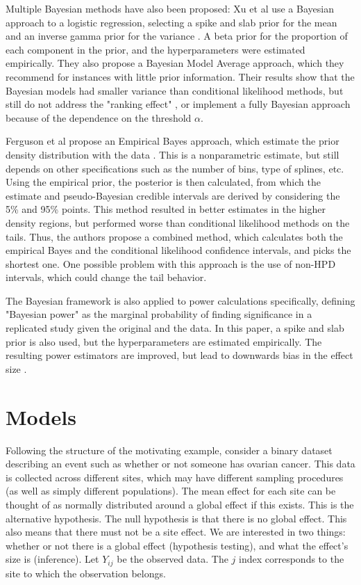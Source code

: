 \documentclass[AMA,STIX1COL]{WileyNJD-v2}\usepackage[]{graphicx}\usepackage[]{color}
\begin{document}
Multiple Bayesian methods have also been proposed: Xu et al use a Bayesian approach to a logistic regression, selecting a spike and slab prior for the mean and an inverse gamma prior for the variance \cite{xu2011bayesian}. A beta prior for the proportion of each component in the prior, and the hyperparameters were estimated empirically. They also propose a Bayesian Model Average approach, which they recommend for instances with little prior information. Their results show that the Bayesian models had smaller variance than conditional likelihood methods, but still do not address the "ranking effect" \cite{sun2011br}, or implement a fully Bayesian approach because of the dependence on the threshold $\alpha$.

Ferguson et al propose an Empirical Bayes approach, which estimate the prior density distribution with the data \cite{ferguson2013empirical}. This is a nonparametric estimate, but still depends on other specifications such as the number of bins, type of splines, etc. Using the empirical prior, the posterior is then calculated, from which the estimate and pseudo-Bayesian credible intervals are derived by considering the 5\% and 95\% points. This method resulted in better estimates in the higher density regions, but performed worse than conditional likelihood methods on the tails. Thus, the authors propose a combined method, which calculates both the empirical Bayes and the conditional likelihood confidence intervals, and picks the shortest one. One possible problem with this approach is the use of non-HPD intervals, which could change the tail behavior.

The Bayesian framework is also applied to power calculations specifically, defining "Bayesian power" as the marginal probability of finding significance in a replicated study given the original and the data. In this paper, a spike and slab prior is also used, but the hyperparameters are estimated empirically. The resulting power estimators are improved, but lead to downwards bias in the effect size \cite{jiang2016power}.

\section{Models}\label{sec:models}


Following the structure of the motivating example, consider a binary dataset describing an event such as whether or not someone has ovarian cancer. This data is collected across different sites, which may have different sampling procedures (as well as simply different populations). The mean effect for each site can be thought of as normally distributed around a global effect if this exists. This is the alternative hypothesis. The null hypothesis is that there is no global effect. This also means that there must not be a site effect. We are interested in two things: whether or not there is a global effect (hypothesis testing), and what the effect's size is (inference). Let $Y_{ij}$ be the observed data. The $j$ index corresponds to the site to which the observation belongs. 
\end{document}
